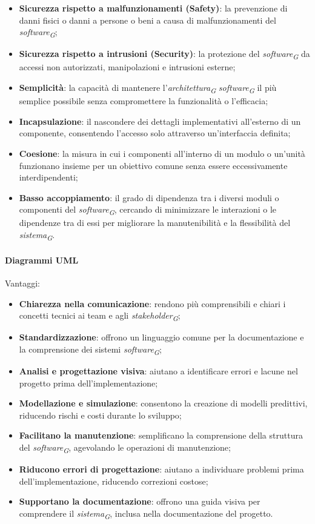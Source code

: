 \begin{itemize}
    \item \textbf{Sicurezza rispetto a malfunzionamenti (Safety)}: la prevenzione di danni fisici o danni a persone o beni a causa di malfunzionamenti del \textit{software}\textsubscript{\textit{G}};
    \item \textbf{Sicurezza rispetto a intrusioni (Security)}: la protezione del \textit{software}\textsubscript{\textit{G}} da accessi non autorizzati, manipolazioni e intrusioni esterne;
    \item \textbf{Semplicità}: la capacità di mantenere l'\textit{architettura}\textsubscript{\textit{G}} \textit{software}\textsubscript{\textit{G}} il più semplice possibile senza compromettere la funzionalità o l'efficacia;
    \item \textbf{Incapsulazione}: il nascondere dei dettagli implementativi all'esterno di un componente, consentendo l'accesso solo attraverso un'interfaccia definita;
    \item \textbf{Coesione}: la misura in cui i componenti all'interno di un modulo o un'unità funzionano insieme per un obiettivo comune senza essere eccessivamente interdipendenti;
    \item \textbf{Basso accoppiamento}: il grado di dipendenza tra i diversi moduli o componenti del \textit{software}\textsubscript{\textit{G}}, cercando di minimizzare le interazioni o le dipendenze tra di essi per migliorare la manutenibilità e la flessibilità del \textit{sistema}\textsubscript{\textit{G}}.
\end{itemize}

\paragraph{Diagrammi UML}
Vantaggi:
\begin{itemize}
    \item \textbf{Chiarezza nella comunicazione}: rendono più comprensibili e chiari i concetti tecnici ai team e agli \textit{stakeholder}\textsubscript{\textit{G}};
    \item \textbf{Standardizzazione}: offrono un linguaggio comune per la documentazione e la comprensione dei sistemi \textit{software}\textsubscript{\textit{G}};
    \item \textbf{Analisi e progettazione visiva}: aiutano a identificare errori e lacune nel progetto prima dell'implementazione;
    \item \textbf{Modellazione e simulazione}: consentono la creazione di modelli predittivi, riducendo rischi e costi durante lo sviluppo;
    \item \textbf{Facilitano la manutenzione}: semplificano la comprensione della struttura del \textit{software}\textsubscript{\textit{G}}, agevolando le operazioni di manutenzione;
    \item \textbf{Riducono errori di progettazione}: aiutano a individuare problemi prima dell'implementazione, riducendo correzioni costose;
    \item \textbf{Supportano la documentazione}: offrono una guida visiva per comprendere il \textit{sistema}\textsubscript{\textit{G}}, inclusa nella documentazione del progetto.
\end{itemize}

